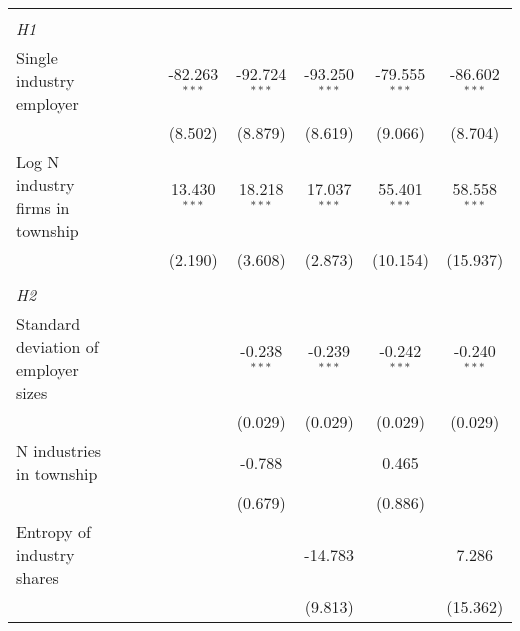 \begin{tabular}{lcccccccc}
\hdashline %
\\[0.1ex] %
\emph{H1} \\ 
   Single industry employer                              &                  &                 &                  & -82.263$^{***}$  & -92.724$^{***}$  & -93.250$^{***}$  & -79.555$^{***}$  & -86.602$^{***}$\\   
                                                         &                  &                 &                  & (8.502)          & (8.879)          & (8.619)          & (9.066)          & (8.704)\\   
   Log N industry firms in township                      &                  &                 &                  & 13.430$^{***}$   & 18.218$^{***}$   & 17.037$^{***}$   & 55.401$^{***}$   & 58.558$^{***}$\\   
                                                         &                  &                 &                  & (2.190)          & (3.608)          & (2.873)          & (10.154)         & (15.937)\\   
\hdashline %
\\[0.1ex] %
\emph{H2} \\ 
   Standard deviation of employer sizes                  &                  &                 &                  &                  & -0.238$^{***}$   & -0.239$^{***}$   & -0.242$^{***}$   & -0.240$^{***}$\\   
                                                         &                  &                 &                  &                  & (0.029)          & (0.029)          & (0.029)          & (0.029)\\   
   N industries in township                              &                  &                 &                  &                  & -0.788           &                  & 0.465            &   \\   
                                                         &                  &                 &                  &                  & (0.679)          &                  & (0.886)          &   \\   
   Entropy of industry shares                            &                  &                 &                  &                  &                  & -14.783          &                  & 7.286\\   
                                                         &                  &                 &                  &                  &                  & (9.813)          &                  & (15.362)\\   

\end{tabular}

